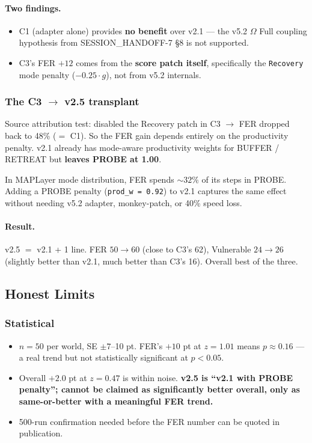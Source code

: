 \paragraph{Two findings.}

\begin{itemize}
\item C1 (adapter alone) provides \textbf{no benefit} over v2.1 ---
the v5.2 $\Omega$ Full coupling hypothesis from
SESSION\_HANDOFF-7 \S 8 is not supported.
\item C3's FER $+12$ comes from the \textbf{score patch itself},
specifically the \texttt{Recovery} mode penalty
($-0.25 \cdot g$), not from v5.2 internals.
\end{itemize}

\subsubsection{The C3 $\to$ v2.5 transplant}

Source attribution test: disabled the Recovery patch in C3 $\to$
FER dropped back to 48\% ($=$ C1). So the FER gain depends entirely
on the productivity penalty. v2.1 already has mode-aware
productivity weights for BUFFER / RETREAT but \textbf{leaves PROBE
at 1.00}.

In MAPLayer mode distribution, FER spends $\sim 32\%$ of its steps
in PROBE. Adding a PROBE penalty (\texttt{prod\_w = 0.92}) to v2.1
captures the same effect without needing v5.2 adapter, monkey-patch,
or 40\% speed loss.

\paragraph{Result.}
v2.5 $=$ v2.1 + 1 line. FER $50 \to 60$ (close to C3's 62),
Vulnerable $24 \to 26$ (slightly better than v2.1, much better than
C3's 16). Overall best of the three.

\subsection{Honest Limits}
\label{sec:methodology-v25-honest-limits}

\subsubsection{Statistical}

\begin{itemize}
\item $n = 50$ per world, SE $\pm 7$--10 pt. FER's $+10$ pt at
$z = 1.01$ means $p \approx 0.16$ --- a real trend but not
statistically significant at $p < 0.05$.
\item Overall $+2.0$ pt at $z = 0.47$ is within noise. \textbf{v2.5
is ``v2.1 with PROBE penalty''; cannot be claimed as significantly
better overall, only as same-or-better with a meaningful FER
trend.}
\item 500-run confirmation needed before the FER number can be
quoted in publication.
\end{itemize}

